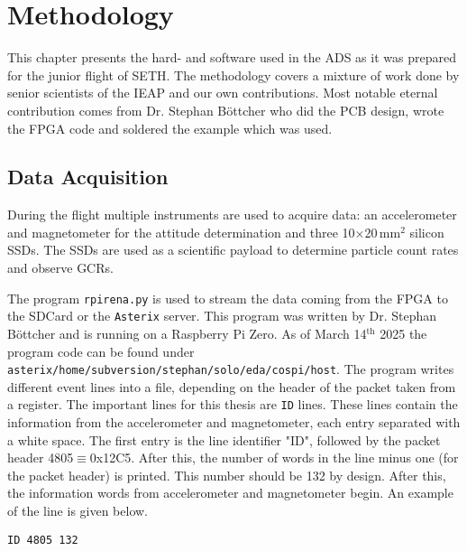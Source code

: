 \chapter{Methodology \label{ch:methodology}}
This chapter presents the hard- and software used in the \ac{ADS} as it was prepared for the junior flight of \ac{SETH}. The methodology covers a mixture of work done by senior scientists of the \ac{IEAP} and our own contributions. Most notable eternal contribution comes from Dr. Stephan Böttcher who did the \ac{PCB} design, wrote the \ac{FPGA} code and soldered the example which was used. 

\section{Data Acquisition \label{sec:meth:data_acquisition}}
During the flight multiple instruments are used to acquire data: an accelerometer and magnetometer for the attitude determination and three 10$\times$20\,mm$^2$ silicon \acfp{SSD}. The \acp{SSD} are used as a scientific payload to determine particle count rates and observe \acp{GCR}.

The program \verb|rpirena.py| is used to stream the data coming from the \ac{FPGA} to the SD\:Card or the \verb|Asterix| server. This program was written by Dr. Stephan Böttcher and is running on a Raspberry Pi Zero. As of March 14$^\mathrm{th}$ 2025 the program code can be found under \verb|asterix/home/subversion/stephan/solo/eda/cospi/host|. The program writes different event lines into a file, depending on the header of the packet taken from a register. The important lines for this thesis are \verb|ID| lines. These lines contain the information from the accelerometer and magnetometer, each entry separated with a white space. The first entry is the line identifier "ID", followed by the packet header 4805$\equiv$0x12C5. After this, the number of words in the line minus one (for the packet header) is printed. This number should be 132 by design. After this, the information words from accelerometer and magnetometer begin. An example of the line is given below.
\begin{lstlisting}
ID 4805 132 
\end{lstlisting} 

